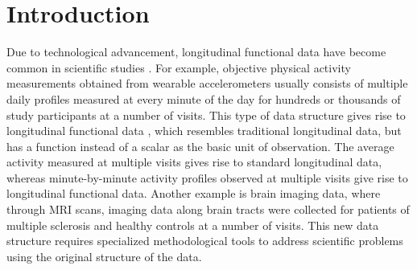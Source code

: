 \documentclass[submit]{smj}
\begin{document}
\maketitle


\section{Introduction}
Due to technological advancement, longitudinal functional data have become common in scientific studies \citep{Ramsay2005}. For example, objective physical activity measurements obtained from wearable accelerometers usually consists of multiple daily profiles measured at every minute of the day for hundreds or thousands of study participants at a number of visits. This type of data structure gives rise to longitudinal functional data \citep{Greven2010,Goldsmith2010}, which resembles traditional longitudinal data, but has a function instead of a scalar as the basic unit of observation. The average activity measured at multiple visits gives rise to standard longitudinal data, whereas  minute-by-minute activity profiles observed at multiple visits give rise to longitudinal functional data. 
Another example is brain imaging data, where through MRI scans, imaging data along brain tracts were collected for patients of multiple sclerosis and healthy controls at a number of visits. 
This new data structure requires specialized methodological tools to address scientific problems using the original structure of the data.
\end{document}
